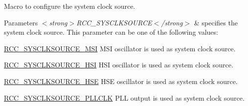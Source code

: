 Macro to configure the system clock source. 


\begin{DoxyParams}{Parameters}
{\em $<$strong$>$\-R\-C\-C\-\_\-\-S\-Y\-S\-C\-L\-K\-S\-O\-U\-R\-C\-E$<$/strong$>$} & specifies the system clock source. This parameter can be one of the following values\-: \begin{DoxyItemize}
\item \hyperlink{group___r_c_c___system___clock___source_ga1e02722521eb426d481d52ba9f79afef}{R\-C\-C\-\_\-\-S\-Y\-S\-C\-L\-K\-S\-O\-U\-R\-C\-E\-\_\-\-M\-S\-I} M\-S\-I oscillator is used as system clock source. \item \hyperlink{group___r_c_c___system___clock___source_gaaeeb699502e7d7a9f1b5d57fcf1f5095}{R\-C\-C\-\_\-\-S\-Y\-S\-C\-L\-K\-S\-O\-U\-R\-C\-E\-\_\-\-H\-S\-I} H\-S\-I oscillator is used as system clock source. \item \hyperlink{group___r_c_c___system___clock___source_ga9116d0627e1e7f33c48e1357b9a35a1c}{R\-C\-C\-\_\-\-S\-Y\-S\-C\-L\-K\-S\-O\-U\-R\-C\-E\-\_\-\-H\-S\-E} H\-S\-E oscillator is used as system clock source. \item \hyperlink{group___r_c_c___system___clock___source_ga5caf08ac71d7dd7e7b2e3e421606aca7}{R\-C\-C\-\_\-\-S\-Y\-S\-C\-L\-K\-S\-O\-U\-R\-C\-E\-\_\-\-P\-L\-L\-C\-L\-K} P\-L\-L output is used as system clock source. \end{DoxyItemize}
\\
\hline
\end{DoxyParams}
